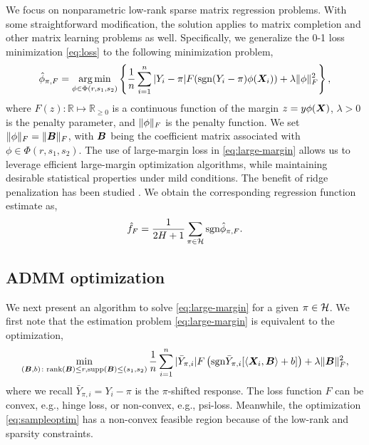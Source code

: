 \documentclass[aos]{imsart}
\theoremstyle{definition}
\def\sign{\textup{sgn}}
\def\rank{\textup{rank}}
\begin{document}
We focus on nonparametric low-rank sparse matrix regression problems. With some straightforward modification, the solution applies to matrix completion and other matrix learning problems as well. Specifically, we generalize the 0-1 loss minimization \eqref{eq:loss} to the following minimization problem, 
\begin{align}\label{eq:large-margin}
\hat \phi_{\pi, F} = \argmin_{\phi \in\Phi(r,s_1,s_2)}\left\{ {1\over n}\sum_{i=1}^n |Y_i-\pi|F(\sign(Y_i-\pi)\phi(\mX_i))+ \lambda \FnormSize{}{\phi}^2\right\},
\end{align}
where $F(z)\colon \mathbb{R}\mapsto \mathbb{R}_{\geq 0}$ is a continuous function of the margin $z=y\phi(\bm X)$, $\lambda>0$ is the penalty parameter, and $\lVert\phi\rVert_F$ is the penalty function. We set $\lVert\phi\rVert_F=\lVert\bm B\rVert_F$, with $\bm B$ being the coefficient matrix associated with $\phi\in\Phi(r,s_1,s_2)$. The use of large-margin loss in \eqref{eq:large-margin} allows us to leverage efficient large-margin optimization algorithms, while maintaining desirable statistical properties under mild conditions. The benefit of ridge penalization has been studied \cite{shen2003psi}. We obtain the corresponding regression function estimate as, 
\begin{equation}\label{eq:stepfunction-large-margin}
\hat f_{F} = {1\over 2H+1}\sum_{\pi \in \tH} \sign \hat \phi_{\pi, F}.
\end{equation}



\subsection{ADMM optimization}

We next present an algorithm to solve \eqref{eq:large-margin} for a given $\pi\in\mathcal{H}$. We first note that the estimation problem \eqref{eq:large-margin} is equivalent to the optimization,
\begin{equation}\label{eq:sampleoptim}
\min_{\substack{(\mB,b)\colon  \rank(\mB)\leq r, \text{supp}(\mB)\leq (s_1,s_2)}}{1\over n}\sum_{i=1}^n|\bar Y_{\pi, i}| F\left( \sign \bar Y_{\pi, i}[\langle \mX_i,\mB \rangle+b] \right) + \lambda\FnormSize{}{\mB}^2,
\end{equation}
where we recall $\bar Y_{\pi, i}=Y_i-\pi$ is the $\pi$-shifted response. The loss function $F$ can be convex, e.g., hinge loss, or non-convex, e.g., psi-loss. Meanwhile, the optimization \eqref{eq:sampleoptim} has a non-convex feasible region because of the low-rank and sparsity constraints. 
\end{document}
